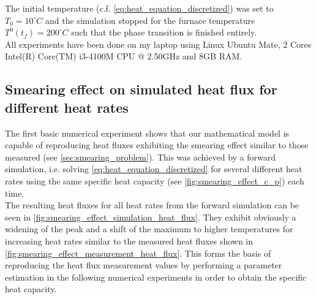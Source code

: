 \documentclass{scrartcl}[12pt, halfparskip]
\numberwithin{equation}{section}
\numberwithin{figure}{section}
\numberwithin{table}{section}
\begin{document}
The initial temperature (c.f. \cref{eq:heat_equation_discretized}) was set to $T_0=10^\circ C$ and the simulation stopped for the furnace temperature $T^0(t_f)=200^\circ C$ such that the phase transition is finished entirely. \\


All experiments have been done on my laptop using Linux Ubuntu Mate, 2 Cores Intel(R) Core(TM) i3-4100M CPU @ 2.50GHz and 8GB RAM. 


\subsection{Smearing effect on simulated heat flux for different heat rates}
The first basic numerical experiment shows that our mathematical model is capable of reproducing heat fluxes exhibiting the smearing effect similar to those measured (see \cref{sec:smearing_problem}). This was achieved by a forward simulation, i.e. solving \cref{eq:heat_equation_discretized} for several different heat rates using the same specific heat capacity (see \cref{fig:smearing_effect_c_p}) each time. \\
The resulting heat fluxes for all heat rates from the forward simulation can be seen in \cref{fig:smearing_effect_simulation_heat_flux}. They exhibit obviously a widening of the peak and a shift of the maximum to higher temperatures for increasing heat rates similar to the measured heat fluxes shown in \cref{fig:smearing_effect_measurement_heat_flux}. This forms the basis of reproducing the heat flux measurement values by performing a parameter estimation in the following numerical experiments in order to obtain the specific heat capacity.\\
\end{document}

